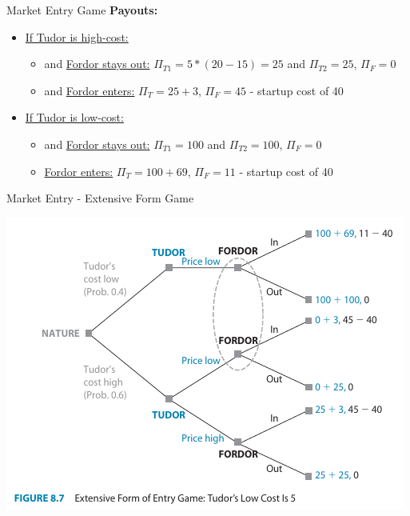 \begin{frame}{Market Entry Game}
  \textbf{Payouts:} 
  \begin{itemize}
    \item \underline{If Tudor is high-cost:} 
    \begin{itemize}
      \item and \underline{Fordor stays out:} 
      $\Pi_{T1} = 5 * (20-15) = 25$ and $\Pi_{T2} = 25$, 
      $\Pi_{F} = 0$
      \item and \underline{Fordor enters:}
      $\Pi_{T} = 25 + 3$,
      $\Pi_{F} = 45 $ - startup cost of 40 
    \end{itemize}
    \item \underline{If Tudor is low-cost:}
    \begin{itemize}
      \item and \underline{Fordor stays out:}
      $\Pi_{T1} = 100$ and $\Pi_{T2} = 100$, 
      $\Pi_{F} = 0$
      \item \underline{Fordor enters:}
      $\Pi_{T} = 100 + 69$,
      $\Pi_{F} = 11$ - startup cost of 40 
    \end{itemize}
  \end{itemize}
\end{frame}

\begin{frame}{Market Entry - Extensive Form Game}
  \begin{center}
    \includegraphics[width=.9\textwidth]{figures/Fig87.png} 
  \end{center} 
\end{frame}


